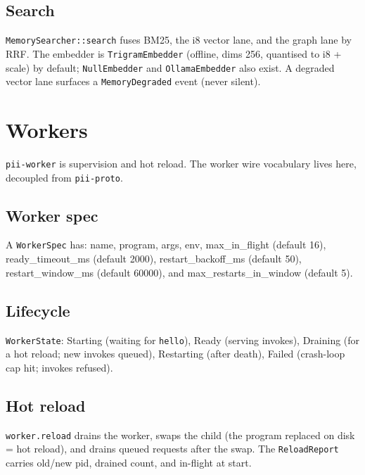 \documentclass[
	fontsize=10pt,
	twoside=false,
	secnumdepth=2,
	open=any,
]{kaobook}
\begin{document}
\section{Search}

\texttt{MemorySearcher::search} fuses BM25, the i8 vector lane, and the
graph lane by RRF. The embedder is \texttt{TrigramEmbedder} (offline,
dims 256, quantised to i8 + scale) by default; \texttt{NullEmbedder} and
\texttt{OllamaEmbedder} also exist. A degraded vector lane surfaces a
\texttt{MemoryDegraded} event (never silent).

\chapter{Workers}
\label{chap:worker}

\texttt{pii-worker} is supervision and hot reload. The worker wire
vocabulary lives here, decoupled from \texttt{pii-proto}.

\section{Worker spec}

A \texttt{WorkerSpec} has: name, program, args, env, max\_in\_flight
(default 16), ready\_timeout\_ms (default 2000), restart\_backoff\_ms
(default 50), restart\_window\_ms (default 60000), and
max\_restarts\_in\_window (default 5).

\section{Lifecycle}

\texttt{WorkerState}: Starting (waiting for \texttt{hello}), Ready
(serving invokes), Draining (for a hot reload; new invokes queued),
Restarting (after death), Failed (crash-loop cap hit; invokes refused).

\section{Hot reload}

\texttt{worker.reload} drains the worker, swaps the child (the program
replaced on disk = hot reload), and drains queued requests after the swap.
The \texttt{ReloadReport} carries old/new pid, drained count, and
in-flight at start.

\end{document}
